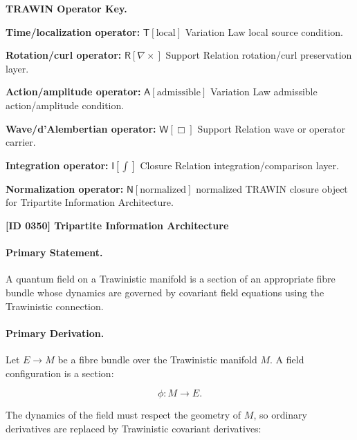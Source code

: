 \par\vspace{0.45\baselineskip}
\noindent\begin{minipage}[t]{\linewidth}
\begingroup
\small
\raggedright
\textbf{TRAWIN Operator Key.}\par
\noindent\textbf{Time/localization operator:} $\mathsf{T}\!\left[\mathrm{local}\right]$ Variation Law local source condition.\par
\noindent\textbf{Rotation/curl operator:} $\mathsf{R}\!\left[\nabla\times\right]$ Support Relation rotation/curl preservation layer.\par
\noindent\textbf{Action/amplitude operator:} $\mathsf{A}\!\left[\mathrm{admissible}\right]$ Variation Law admissible action/amplitude condition.\par
\noindent\textbf{Wave/d'Alembertian operator:} $\mathsf{W}\!\left[\Box\right]$ Support Relation wave or operator carrier.\par
\noindent\textbf{Integration operator:} $\mathsf{I}\!\left[\int\right]$ Closure Relation integration/comparison layer.\par
\noindent\textbf{Normalization operator:} $\mathsf{N}\!\left[\mathrm{normalized}\right]$ normalized TRAWIN closure object for Tripartite Information Architecture.\par
\endgroup
\end{minipage}

\clearpage
\noindent\textbf{[ID 0350] Tripartite Information Architecture}\par
\vspace{0.35em}
\paragraph{Primary Statement.}
A quantum field on a Trawinistic manifold is a section of an appropriate fibre bundle whose dynamics are governed by covariant field equations using the Trawinistic connection.

\paragraph{Primary Derivation.}
Let $E\to M$ be a fibre bundle over the Trawinistic manifold $M$.  
A field configuration is a section:

\begin{equation}
\phi:M\to E .
\end{equation}

The dynamics of the field must respect the geometry of $M$, so ordinary derivatives are replaced by Trawinistic covariant derivatives:

